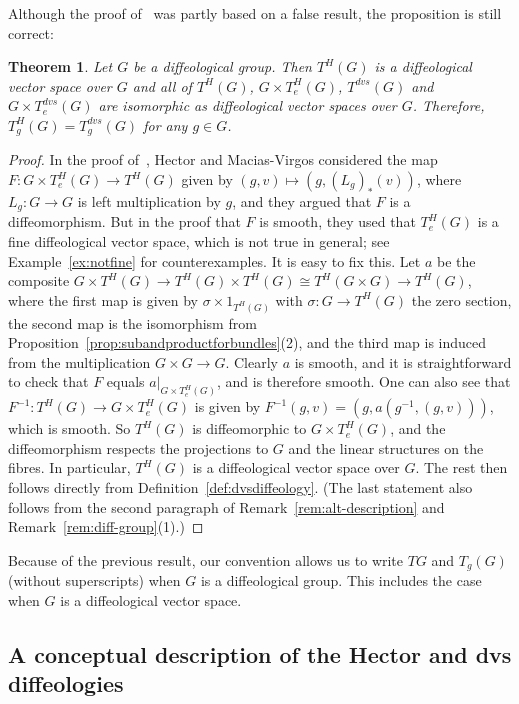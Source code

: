 \documentclass{amsart}
\newtheorem{thm}[de]{Theorem}
\theoremstyle{remark}
\newcommand{\ra}{\to}
\begin{document}
Although the proof of~\cite[Proposition~6.8]{HM} was partly based on a false result,
the proposition is still correct:

\begin{thm}\label{thm:Tdiffgrptrivial}
Let $G$ be a diffeological group.
Then $T^H(G)$ is a diffeological vector space over $G$ and
all of $T^H(G)$, $G \times T_e^H(G)$, $T^{dvs}(G)$ and $G \times T_e^{dvs}(G)$
are isomorphic as diffeological vector spaces over $G$.
Therefore, $T_g^H(G) = T_g^{dvs}(G)$ for any $g \in G$.
\end{thm}

\begin{proof}
In the proof of~\cite[Proposition~6.8]{HM}, Hector and Macias-Virgos considered the map
$F:G \times T_e^H(G) \ra T^H(G)$ given by $(g,v) \mapsto (g,(L_g)_*(v))$,
where $L_g:G \ra G$ is left multiplication by $g$,
and they argued that $F$ is a diffeomorphism.
But in the proof that $F$ is smooth, they used that
$T_e^H(G)$ is a fine diffeological vector space, which is not true in general;
see Example~\ref{ex:notfine} for counterexamples.
It is easy to fix this.
Let $a$ be the composite $G \times T^H(G) \ra T^H(G) \times T^H(G)
\cong T^H(G \times G) \ra T^H(G)$, where the first map is given by
$\sigma \times 1_{T^H(G)}$ with $\sigma:G \ra T^H(G)$ the zero section,
the second map is the isomorphism from Proposition~\ref{prop:subandproductforbundles}(2),
and the third map is induced from the multiplication $G \times G \ra G$.
Clearly $a$ is smooth, and it is straightforward to check that $F$ equals $a|_{G \times T_e^H(G)}$,
and is therefore smooth.
One can also see that $F^{-1} : T^H(G) \to G \times T_e^H(G)$ is given by
$F^{-1}(g, v) = (g, a(g^{-1}, (g, v)))$, which is smooth.
So $T^H(G)$ is diffeomorphic to $G \times T_e^H(G)$, and the diffeomorphism
respects the projections to $G$ and the linear structures on the fibres.
In particular, $T^H(G)$ is a diffeological vector space over $G$.
The rest then follows directly from Definition~\ref{def:dvsdiffeology}.
(The last statement also follows from the second paragraph of 
Remark~\ref{rem:alt-description} and Remark~\ref{rem:diff-group}(1).)
\end{proof}

Because of the previous result, our convention allows us to write $TG$ and $T_g(G)$
(without superscripts) when $G$ is a diffeological group.
This includes the case when $G$ is a diffeological vector space.

\subsection{A conceptual description of the Hector and dvs diffeologies}\label{ss:conceptual}
\end{document}
